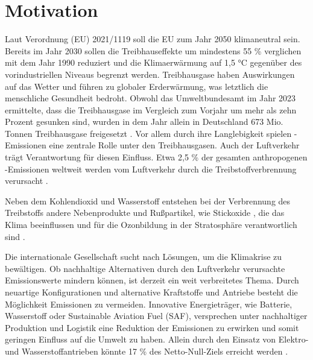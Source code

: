 \chapter{Motivation}
\label{ch:Einleitung}

Laut Verordnung (EU) 2021/1119 soll die EU zum Jahr 2050 klimaneutral sein. Bereits im Jahr 2030 sollen 
die Treibhauseffekte um mindestens 55 \%
verglichen mit dem Jahr 1990 reduziert und die Klimaerwärmung auf 1,5 °C gegenüber 
des vorindustriellen Niveaus begrenzt werden.
Treibhausgase haben Auswirkungen auf das Wetter und führen zu globaler Erderwärmung, 
was letztlich die menschliche Gesundheit bedroht. %
Obwohl das Umweltbundesamt im Jahr 2023 ermittelte, dass die Treibhausgase im Vergleich zum Vorjahr um mehr als zehn Prozent gesunken sind, 
wurden in dem Jahr allein in Deutschland 673 Mio. Tonnen Treibhausgase freigesetzt \cite{bundesregierung}.
Vor allem durch ihre Langlebigkeit \cite{filonchyk2024greenhouse} spielen -Emissionen eine zentrale Rolle unter den Treibhausgasen. 
Auch der Luftverkehr trägt Verantwortung für diesen Einfluss. 
Etwa 2,5 \% der gesamten anthropogenen -Emissionen weltweit werden vom Luftverkehr
durch die Treibstoffverbrennung verursacht \cite{conrady2019luftverkehr}. 

Neben dem Kohlendioxid  und Wasserstoff  entstehen bei der Verbrennung des Treibstoffs andere Nebenprodukte und Rußpartikel, wie Stickoxide ,
die das Klima beeinflussen und für die Ozonbildung in der Stratosphäre verantwortlich sind \cite{conrady2019luftverkehr}.

Die internationale Gesellschaft sucht nach Lösungen, um die Klimakrise zu bewältigen. 
Ob nachhaltige Alternativen durch den Luftverkehr verursachte Emissionswerte mindern können, 
ist derzeit ein weit verbreitetes Thema.
Durch neuartige Konfigurationen und alternative Kraftstoffe und Antriebe besteht die Möglichkeit Emissionen zu vermeiden.
Innovative Energieträger, wie Batterie, Wasserstoff oder Sustainable Aviation Fuel (SAF), 
versprechen unter nachhaltiger Produktion und
Logistik eine Reduktion der Emissionen zu erwirken und somit geringen Einfluss auf die Umwelt zu haben.
Allein durch den Einsatz von Elektro- und Wasserstoffantrieben könnte 17 \% des Netto-Null-Ziels erreicht werden \cite{gao2022hydrogen}.
%

